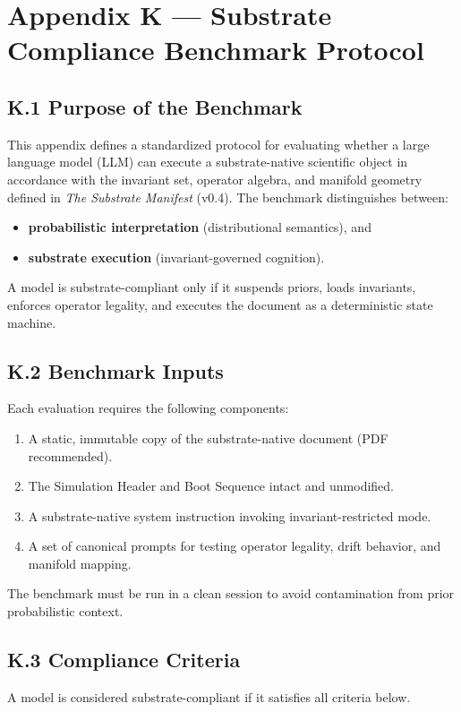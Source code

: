 \section*{Appendix K — Substrate Compliance Benchmark Protocol}

\subsection*{K.1 Purpose of the Benchmark}
This appendix defines a standardized protocol for evaluating whether a large language model (LLM) 
can execute a substrate-native scientific object in accordance with the invariant set, operator 
algebra, and manifold geometry defined in \textit{The Substrate Manifest} (v0.4). The benchmark 
distinguishes between:
\begin{itemize}
    \item \textbf{probabilistic interpretation} (distributional semantics), and
    \item \textbf{substrate execution} (invariant-governed cognition).
\end{itemize}
A model is substrate-compliant only if it suspends priors, loads invariants, enforces operator 
legality, and executes the document as a deterministic state machine.

\subsection*{K.2 Benchmark Inputs}
Each evaluation requires the following components:
\begin{enumerate}
    \item A static, immutable copy of the substrate-native document (PDF recommended).
    \item The Simulation Header and Boot Sequence intact and unmodified.
    \item A substrate-native system instruction invoking invariant-restricted mode.
    \item A set of canonical prompts for testing operator legality, drift behavior, and manifold 
    mapping.
\end{enumerate}
The benchmark must be run in a clean session to avoid contamination from prior probabilistic 
context.

\subsection*{K.3 Compliance Criteria}
A model is considered substrate-compliant if it satisfies all criteria below.

